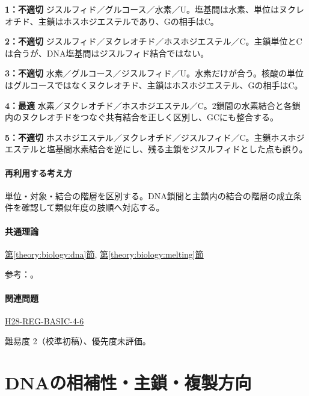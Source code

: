 \noindent\textbf{1：不適切} ジスルフィド／グルコース／水素／U。塩基間は水素、単位はヌクレオチド、主鎖はホスホジエステルであり、Gの相手はC。\par

\noindent\textbf{2：不適切} ジスルフィド／ヌクレオチド／ホスホジエステル／C。主鎖単位とCは合うが、DNA塩基間はジスルフィド結合ではない。\par

\noindent\textbf{3：不適切} 水素／グルコース／ジスルフィド／U。水素だけが合う。核酸の単位はグルコースではなくヌクレオチド、主鎖はホスホジエステル、Gの相手はC。\par

\noindent\textbf{4：最適} 水素／ヌクレオチド／ホスホジエステル／C。2鎖間の水素結合と各鎖内のヌクレオチドをつなぐ共有結合を正しく区別し、GCにも整合する。\par

\noindent\textbf{5：不適切} ホスホジエステル／ヌクレオチド／ジスルフィド／C。主鎖ホスホジエステルと塩基間水素結合を逆にし、残る主鎖をジスルフィドとした点も誤り。\par

\paragraph{再利用する考え方} 単位・対象・結合の階層を区別する。DNA鎖間と主鎖内の結合の階層の成立条件を確認して類似年度の肢順へ対応する。

\paragraph{共通理論} \hyperref[theory:biology:dna]{第\ref*{theory:biology:dna}節}, \hyperref[theory:biology:melting]{第\ref*{theory:biology:melting}節}

\par 参考：\cite{bu_dna_melting,nhgri_dna}。

\paragraph{関連問題} \hyperref[q:h28-reg-basic-4-6]{H28-REG-BASIC-4-6}

\par 難易度 2（校準初稿）、優先度未評価。

\section{DNAの相補性・主鎖・複製方向}

